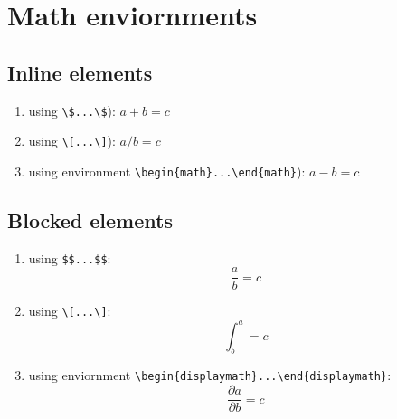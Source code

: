 \documentclass[12pt]{article}
\begin{document}
\setlength\parindent{0pt}

\section{Math enviornments}
\subsection*{Inline elements}
\begin{enumerate}
	\item using \verb!\$...\$!): $a+b=c$ 
	\item using \verb!\[...\]!): \(a/b=c\) 
	\item using environment \verb!\begin{math}...\end{math}!): 
		\begin{math}
		a - b = c
		\end{math}
\end{enumerate}

\subsection*{Blocked elements}
\begin{enumerate}
	\item using \verb!$$...$$!: $$ \frac{a}{b}=c $$
	\item using \verb!\[...\]!: \[ \int^a_b = c\]
	\item using enviornment \verb!\begin{displaymath}...\end{displaymath}!:
		\begin{displaymath}
		\dfrac{\partial a}{\partial	b} = c
		\end{displaymath}
\end{enumerate}
\end{document}
